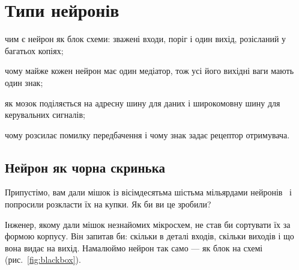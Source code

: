 \chapter{Типи нейронів}
\label{sec:neurontypes}
\begin{chaptergoals}
\item чим є нейрон як блок схеми: зважені входи, поріг і один вихід, розісланий у багатьох копіях;
\item чому майже кожен нейрон має один медіатор, тож усі його вихідні ваги мають один знак;
\item як мозок поділяється на адресну шину для даних і широкомовну шину для керувальних сигналів;
\item чому  розсилає помилку передбачення і чому знак задає рецептор отримувача.
\end{chaptergoals}

\section{Нейрон як чорна скринька}

Припустімо, вам дали мішок із вісімдесятьма шістьма мільярдами нейронів~\cite{Azevedo2009} і попросили розкласти їх на купки. Як би ви це зробили?

Інженер, якому дали мішок незнайомих мікросхем, не став би сортувати їх за формою корпусу. Він запитав би: скільки в деталі входів, скільки виходів і що вона видає на вихід. Намалюймо нейрон так само --- як блок на схемі (рис.~\ref{fig:blackbox}).

